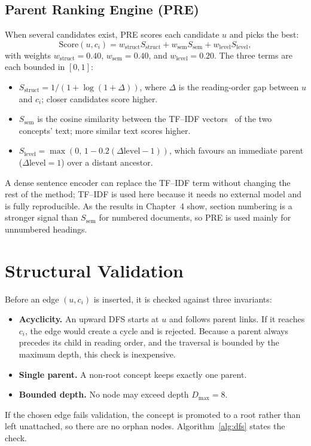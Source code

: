 \documentclass[12pt,a4paper]{report}
\begin{document}
\subsection{Parent Ranking Engine (PRE)}
When several candidates exist, PRE scores each candidate $u$ and picks the best:
\begin{equation}
\text{Score}(u,c_i)=w_{\text{struct}}S_{\text{struct}}+w_{\text{sem}}S_{\text{sem}}+w_{\text{level}}S_{\text{level}},
\label{eq:pre}
\end{equation}
with weights $w_{\text{struct}}=0.40$, $w_{\text{sem}}=0.40$, and $w_{\text{level}}=0.20$.
The three terms are each bounded in $[0,1]$:
\begin{itemize}
  \item $S_{\text{struct}}=1/(1+\log(1+\Delta))$, where $\Delta$ is the reading-order
  gap between $u$ and $c_i$; closer candidates score higher.
  \item $S_{\text{sem}}$ is the cosine similarity between the TF--IDF
  vectors~\cite{salton1983introduction} of the two concepts' text; more similar text
  scores higher.
  \item $S_{\text{level}}=\max(0,\,1-0.2(\Delta\mathrm{level}-1))$, which favours an
  immediate parent ($\Delta\mathrm{level}=1$) over a distant ancestor.
\end{itemize}
A dense sentence encoder can replace the TF--IDF term without changing the rest of the
method; TF--IDF is used here because it needs no external model and is fully
reproducible. As the results in Chapter~4 show, section numbering is a stronger signal
than $S_{\text{sem}}$ for numbered documents, so PRE is used mainly for unnumbered
headings.

\section{Structural Validation}
\label{sec:invariants}
Before an edge $(u,c_i)$ is inserted, it is checked against three invariants:
\begin{itemize}
  \item \textbf{Acyclicity.} An upward DFS starts at $u$ and follows parent links. If it
  reaches $c_i$, the edge would create a cycle and is rejected. Because a parent always
  precedes its child in reading order, and the traversal is bounded by the maximum depth,
  this check is inexpensive.
  \item \textbf{Single parent.} A non-root concept keeps exactly one parent.
  \item \textbf{Bounded depth.} No node may exceed depth $D_{\max}=8$.
\end{itemize}
If the chosen edge fails validation, the concept is promoted to a root rather than left
unattached, so there are no orphan nodes. Algorithm~\ref{alg:dfs} states the check.
\end{document}
